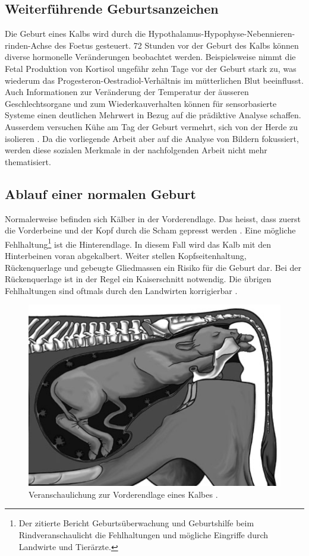 \subsection{Weiterführende Geburtsanzeichen}
Die Geburt eines Kalbs wird durch die \gls{Hypothalamus}-\gls{Hypophyse}-Nebennieren-rinden-Achse des \gls{Foetus} gesteuert. 72 Stunden vor der Geburt des Kalbs können diverse hormonelle Veränderungen beobachtet werden. Beispielsweise nimmt die \gls{Fetal} Produktion von Kortisol ungefähr zehn Tage vor der Geburt stark zu, was wiederum das \gls{Progesteron}-\gls{Oestradiol}-Verhältnis im mütterlichen Blut beeinflusst. Auch Informationen zur Veränderung der Temperatur der äusseren Geschlechtsorgane und zum Wiederkauverhalten können für sensorbasierte Systeme einen deutlichen Mehrwert in Bezug auf die prädiktive Analyse schaffen. Ausserdem versuchen Kühe am Tag der Geburt vermehrt, sich von der Herde zu isolieren \citep[S.1-4]{Saint-Dizier2015}. 
Da die vorliegende Arbeit aber auf die Analyse von Bildern fokussiert, werden diese sozialen Merkmale in der nachfolgenden Arbeit nicht mehr thematisiert. 
\subsection{Ablauf einer normalen Geburt}
Normalerweise befinden sich Kälber in der Vorderendlage. Das heisst, dass zuerst die Vorderbeine und der Kopf durch die Scham gepresst werden \citep{Muller2020}. Eine mögliche Fehlhaltung\footnote{Der zitierte Bericht \flqq Geburtsüberwachung und Geburtshilfe beim Rind\frqq veranschaulicht die Fehlhaltungen und mögliche Eingriffe durch Landwirte und Tierärzte.} ist die Hinterendlage. In diesem Fall wird das Kalb mit den Hinterbeinen voran abgekalbert. Weiter stellen Kopfseitenhaltung, Rückenquerlage und gebeugte Gliedmassen ein Risiko für die Geburt dar. Bei der Rückenquerlage ist in der Regel ein Kaiserschnitt notwendig. Die übrigen Fehlhaltungen sind oftmals durch den Landwirten korrigierbar \citep[S. 17, 24-26]{Traulsen2013}.

\begin{figure}[H]
	\center
	\includegraphics[scale=.45]{Grafiken/vorderendlage.png}
	\caption{Veranschaulichung zur Vorderendlage eines Kalbes \citep[S. 17]{Traulsen2013}.}
	\label{fig: Schwanzhebung}
\end{figure}

